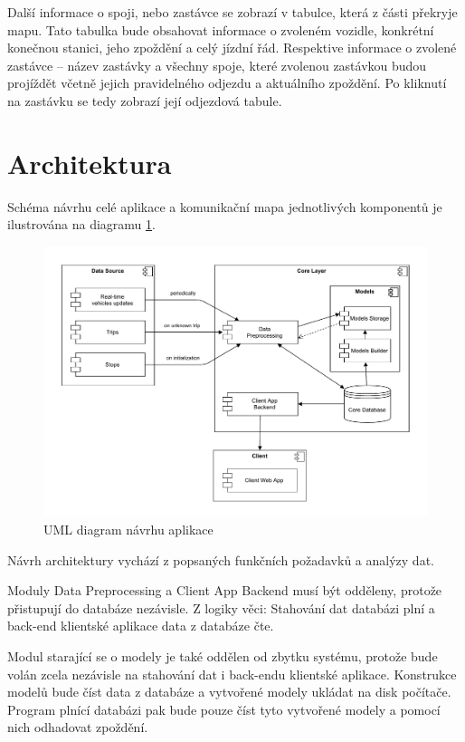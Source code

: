 Další informace o spoji, nebo zastávce se zobrazí v tabulce, která z části překryje mapu. Tato tabulka bude obsahovat informace o zvoleném vozidle, konkrétní konečnou stanici, jeho zpoždění a celý jízdní řád. Respektive informace o zvolené zastávce – název zastávky a všechny spoje, které zvolenou zastávkou budou projíždět včetně jejich pravidelného odjezdu a aktuálního zpoždění. Po kliknutí na zastávku se tedy zobrazí její odjezdová tabule.


\section{Architektura}


Schéma návrhu celé aplikace a komunikační mapa jednotlivých komponentů je ilustrována na diagramu \ref{fig:design_diagram}.


\begin{figure}
\centering
  \includegraphics[width=\linewidth]{../img/design_diagram}
  \caption{UML diagram návrhu aplikace}
  \label{fig:design_diagram}
\end{figure}


\bigbreak


Návrh architektury vychází z popsaných funkčních požadavků a analýzy dat.


\bigbreak


Moduly Data Preprocessing a Client App Backend musí být odděleny, protože přistupují do databáze nezávisle. Z logiky věci: Stahování dat databázi plní a back-end klientské aplikace data z databáze čte.


\bigbreak


Modul starající se o modely je také oddělen od zbytku systému, protože bude volán zcela nezávisle na stahování dat i back-endu klientské aplikace. Konstrukce modelů bude číst data z databáze a vytvořené modely ukládat na disk počítače. Program plnící databázi pak bude pouze číst tyto vytvořené modely a pomocí nich odhadovat zpoždění.

 
